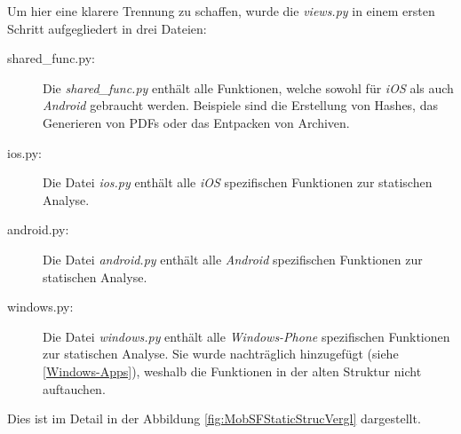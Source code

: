 \pagebreak
 Um hier eine klarere Trennung zu schaffen, wurde die \textit{views.py} in einem ersten Schritt aufgegliedert in drei Dateien:
\begin{description}
	\item[shared\_func.py: ] Die \textit{shared\_func.py} enthält alle Funktionen, welche sowohl für \textit{iOS} als auch \textit{Android} gebraucht werden. Beispiele sind die Erstellung von Hashes, das Generieren von PDFs oder das Entpacken von Archiven.
	
	\item[ios.py: ] Die Datei \textit{ios.py} enthält alle \textit{iOS} spezifischen Funktionen zur statischen Analyse.
	
	\item[android.py: ] Die Datei \textit{android.py} enthält alle \textit{Android} spezifischen Funktionen zur statischen Analyse.
	
	\item[windows.py: ] Die Datei \textit{windows.py} enthält alle \textit{Windows-Phone} spezifischen Funktionen zur statischen Analyse. Sie wurde nachträglich hinzugefügt (siehe \ref{Windows-Apps}), weshalb die Funktionen in der alten Struktur nicht auftauchen.
\end{description}
Dies ist im Detail in der Abbildung \ref{fig:MobSFStaticStrucVergl} dargestellt.\\

